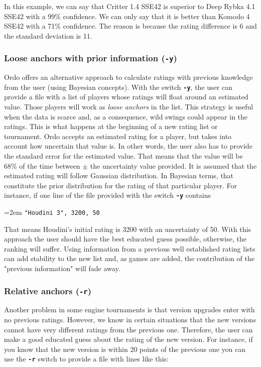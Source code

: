 \documentclass[12pt]{article}
\newcommand{\swtch} [1] {\texttt{\textbf{#1}}}
\newcommand{\cmdln}[1]{
	\par
	\begingroup
		\leftskip=2em
		\addtolength{\rightskip}{0em}
		\noindent \small{\texttt{#1}}
		\par
	\endgroup
}
\newcommand{\inctxt}[1]{
	\begingroup
    \fontsize{9pt}{11pt}\selectfont
		 
	\endgroup
}
\begin{document}
\inctxt{readme-example-j-switch.txt}
In this example, we can say that Critter 1.4 SSE42 is superior to Deep Rybka 4.1 SSE42 with a 99\% confidence. We can only say that it is better than Komodo 4 SSE42 with a 71\% confidence. The reason is because the rating difference is 6 and the standard deviation is 11.


\subsubsection*{Loose anchors with prior information (\swtch{-y})}

Ordo offers an alternative approach to calculate ratings with previous knowledge from the user (using Bayesian concepts). 
With the switch \swtch{-y}, the user can provide a file with a list of players whose ratings will float around an estimated value.
Those players will work as \textit{loose anchors} in the list.
This strategy is useful when the data is scarce and, as a consequence, wild swings could appear in the ratings.
This is what happens at the beginning of a new rating list or tournament. 
Ordo accepts an estimated rating for a player, but takes into account how uncertain that value is.
In other words, the user also has to provide the standard error for the estimated value. 
That means that the value will be 68\% of the time between $\pm$ the uncertainty value provided.
It is assumed that the estimated rating will follow Gaussian distribution. 
In Bayesian terms, that constitute the prior distribution for the rating of that particular player.
For instance, if one line of the file provided with the switch \swtch{-y} contains


\cmdln{"Houdini 3",  3200,  50}

That means Houdini's initial rating is 3200 with an uncertainty of 50. 
With this approach the user should have the best educated guess possible, otherwise, the ranking will suffer. 
Using information from a previous well established rating lists can add stability to the new list and, as games are added, the contribution of the "previous information" will fade away.

\subsubsection*{Relative anchors (\swtch{-r})}

Another problem in some engine tournaments is that version upgrades enter with no previous ratings. 
However, we know in certain situations that the new versions cannot have very different ratings from the previous one. 
Therefore, the user can make a good educated guess about the rating of the new version. 
For instance, if you know that the new version is within 20 points of the previous one you can use the \swtch{-r} switch to provide a file with lines like this:
\end{document}

